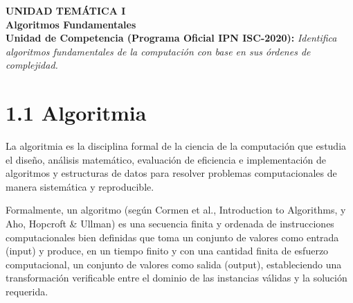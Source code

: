\documentclass[11pt,letterpaper]{article}
\begin{document}
\newpage
\tableofcontents
\newpage
\newpage
\noindent\colorbox{ipnguinda!10}{\parbox{\dimexpr\linewidth-2\fboxsep\relax}{\vspace{6pt}\textbf{\color{ipnblue}\small UNIDAD TEMÁTICA I}\\[4pt]\textbf{\color{ipnguinda}\LARGE Algoritmos Fundamentales}\\[6pt]\textbf{\color{ipnblue}Unidad de Competencia (Programa Oficial IPN ISC-2020):} \textit{Identifica algoritmos fundamentales de la computación con base en sus órdenes de complejidad.}\vspace{6pt}}}\vspace{10pt}
\section*{1.1 Algoritmia}
La algoritmia es la disciplina formal de la ciencia de la computación que estudia el diseño, análisis matemático, evaluación de eficiencia e implementación de algoritmos y estructuras de datos para resolver problemas computacionales de manera sistemática y reproducible.\par
Formalmente, un algoritmo (según Cormen et al., Introduction to Algorithms, y Aho, Hopcroft \& Ullman) es una secuencia finita y ordenada de instrucciones computacionales bien definidas que toma un conjunto de valores como entrada (input) y produce, en un tiempo finito y con una cantidad finita de esfuerzo computacional, un conjunto de valores como salida (output), estableciendo una transformación verificable entre el dominio de las instancias válidas y la solución requerida.\par
\end{document}
